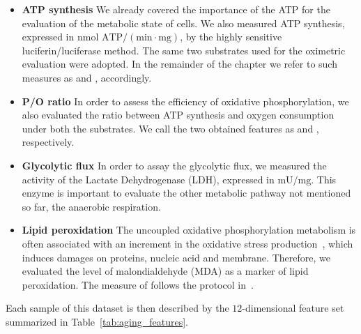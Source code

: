 \begin{itemize}
	\item[] \textbf{ATP synthesis} We already covered the importance of the ATP for the evaluation of the metabolic state of cells. We also measured ATP synthesis, expressed in $\text{nmol~ATP}/(\text{min}\cdot\text{mg})$,  by the highly sensitive luciferin/luciferase method. The same two substrates used for the oximetric evaluation were adopted. In the remainder of the chapter we refer to such measures as \atppyrmal and \atpsucc, accordingly.
	
	\item[] \textbf{P/O ratio} In order to assess the efficiency of oxidative phosphorylation, we also evaluated the ratio between ATP synthesis and oxygen consumption under both the substrates. We call the two obtained features as \popyrmal and \posucc, respectively.
	
	\item[] \textbf{Glycolytic flux} In order to assay the glycolytic flux, we measured the activity of the Lactate Dehydrogenase (\ac{LDH}), expressed in $\text{mU}/\text{mg}$. This enzyme is important to evaluate the other metabolic pathway not mentioned so far, \ie the anaerobic respiration.
	
	\item[] \textbf{Lipid peroxidation} The uncoupled oxidative phosphorylation metabolism is often associated with an increment in the oxidative stress production~\cite{dai2014mitochondrial}, which induces damages on proteins, nucleic acid and membrane. Therefore, we evaluated the level of malondialdehyde (\ac{MDA}) as a marker of lipid peroxidation. The measure of \mda follows the protocol in~\cite{ravera2015oxidative}.	
\end{itemize}

Each sample of this dataset is then described by the $12$-dimensional feature set summarized in Table~\ref{tab:aging_features}.


